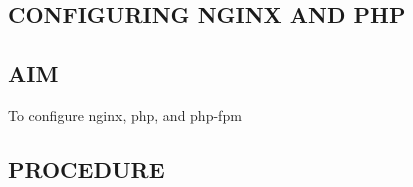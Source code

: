 \documentclass{article}
\begin{document}
\begin{verbatim}
    
\end{verbatim}
\newpage
\begin{flushleft}

\section{CONFIGURING NGINX AND PHP}
\hrulefill
\vspace{1cm}
\subsection{AIM}
To configure nginx, php, and php-fpm
\subsection{PROCEDURE}
\vspace{0.2in}

\end{flushleft}
\end{document}
